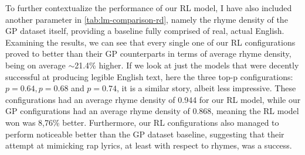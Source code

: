 To further contextualize the performance of our RL model, I have also included another parameter in \cref{tab:lm-comparison-rd}, namely the rhyme density of the GP dataset itself, providing a baseline fully comprised of real, actual English. Examining the results, we can see that every single one of our RL configurations proved to better than their GP counterparts in terms of average rhyme density, being on average $\sim$21.4\% higher. If we look at just the models that were decently successful at producing legible English text, here the three top-p configurations: $p=0.64, p=0.68$ and $p=0.74$, it is a similar story, albeit less impressive. These configurations had an average rhyme density of 0.944 for our RL model, while our GP configurations had an average rhyme density of 0.868, meaning the RL model won was 8,76\% better. Furthermore, our RL configurations also managed to perform noticeable better than the GP dataset baseline, suggesting that their attempt at mimicking rap lyrics, at least with respect to rhymes, was a success.
